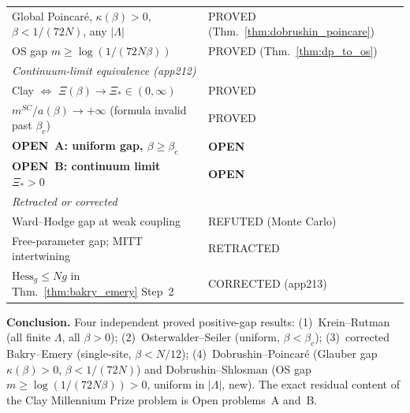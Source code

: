 \begin{center}
\begin{tabular}{p{8.5cm}|l}
Global Poincar\'{e}, $\kappa(\beta)>0$, $\beta<1/(72N)$, any $|\Lambda|$ & PROVED (Thm.~\ref{thm:dobrushin_poincare})\\
OS gap $m\ge\log(1/(72N\beta))$ & PROVED (Thm.~\ref{thm:dp_to_os})\\
\hline
\multicolumn{2}{l}{\textit{Continuum-limit equivalence (app212)}}\\
Clay $\Leftrightarrow$ $\Xi(\beta)\to\Xi_*\in(0,\infty)$ & PROVED\\
$m^{SC}/a(\beta)\to+\infty$ (formula invalid past $\beta_c$) & PROVED\\
\hline
\textbf{OPEN~A: uniform gap, $\beta\ge\beta_c$} & \textbf{OPEN}\\
\textbf{OPEN~B: continuum limit $\Xi_*>0$} & \textbf{OPEN}\\
\hline
\multicolumn{2}{l}{\textit{Retracted or corrected}}\\
Ward--Hodge gap at weak coupling & REFUTED (Monte Carlo)\\
Free-parameter gap; MITT intertwining & RETRACTED\\
$\mathrm{Hess}_g\le Ng$ in Thm.~\ref{thm:bakry_emery} Step~2 & CORRECTED (app213)\\
\hline
\end{tabular}
\end{center}

\medskip\noindent\textbf{Conclusion.}
Four independent proved positive-gap results:
(1)~Krein--Rutman (all finite $\Lambda$, all $\beta>0$);
(2)~Osterwalder--Seiler (uniform, $\beta<\beta_c$);
(3)~corrected Bakry--Emery (single-site, $\beta<N/12$);
(4)~Dobrushin--Poincar\'{e} (Glauber gap $\kappa(\beta)>0$, $\beta<1/(72N)$) and
Dobrushin--Shlosman (OS gap $m\ge\log(1/(72N\beta))>0$, uniform in $|\Lambda|$, new).
The exact residual content of the Clay Millennium Prize problem
is Open problems~A and~B.

\endinput
